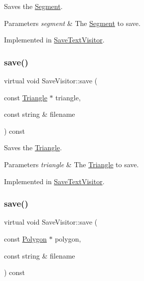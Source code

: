 Saves the \hyperlink{class_segment}{Segment}. 
\begin{DoxyParams}{Parameters}
{\em segment} & The \hyperlink{class_segment}{Segment} to save. \\
\hline
\end{DoxyParams}


Implemented in \hyperlink{class_save_text_visitor_aded2d7fe5898a3fd55bf4d15ed405416}{Save\+Text\+Visitor}.

\hypertarget{class_save_visitor_aa94777a1d367e937294ffd467835dc31}{}\label{class_save_visitor_aa94777a1d367e937294ffd467835dc31} 
\subsubsection{\texorpdfstring{save()}{save()}\hspace{0.1cm}{\footnotesize\ttfamily [3/5]}}
{\footnotesize\ttfamily virtual void Save\+Visitor\+::save (\begin{DoxyParamCaption}\item[{const \hyperlink{class_triangle}{Triangle} $\ast$}]{triangle,  }\item[{const string \&}]{filename }\end{DoxyParamCaption}) const\hspace{0.3cm}{\ttfamily [pure virtual]}}

Saves the \hyperlink{class_triangle}{Triangle}. 
\begin{DoxyParams}{Parameters}
{\em triangle} & The \hyperlink{class_triangle}{Triangle} to save. \\
\hline
\end{DoxyParams}


Implemented in \hyperlink{class_save_text_visitor_a1ac892a59b374572d44fc69b9b3528c0}{Save\+Text\+Visitor}.

\hypertarget{class_save_visitor_aa24d8ccd081233a49ad31396e265af81}{}\label{class_save_visitor_aa24d8ccd081233a49ad31396e265af81} 
\subsubsection{\texorpdfstring{save()}{save()}\hspace{0.1cm}{\footnotesize\ttfamily [4/5]}}
{\footnotesize\ttfamily virtual void Save\+Visitor\+::save (\begin{DoxyParamCaption}\item[{const \hyperlink{class_polygon}{Polygon} $\ast$}]{polygon,  }\item[{const string \&}]{filename }\end{DoxyParamCaption}) const\hspace{0.3cm}{\ttfamily [pure virtual]}}

